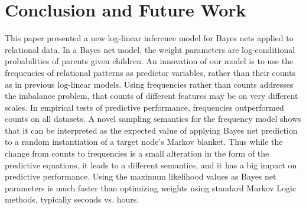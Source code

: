 \documentclass{article}
\begin{document}

\section{Conclusion and Future Work} %
This paper presented a new log-linear inference model for Bayes nets applied to relational data. In a Bayes net model, the weight parameters are log-conditional probabilities of parents given children. An innovation of our model is to  use  the frequencies of relational patterns as predictor variables, rather than their counts as in previous log-linear models.
Using frequencies rather than counts addresses the imbalance problem, that counts of different features may be on very different scales. In empirical tests of predictive performance, frequencies outperformed counts on all datasets. 
A novel sampling semantics for the frequency model shows that it can be interpreted as the expected value of applying Bayes net prediction to a random instantiation of a target node's Markov blanket. Thus while the change from counts to frequencies is a small alteration in the form of the predictive equations, it leads to a different semantics, and it has a big impact on predictive performance.
Using the maximum likelihood values as Bayes net parameters is much faster than optimizing weights using standard Markov Logic methods, typically seconds vs. hours. 
\end{document}
